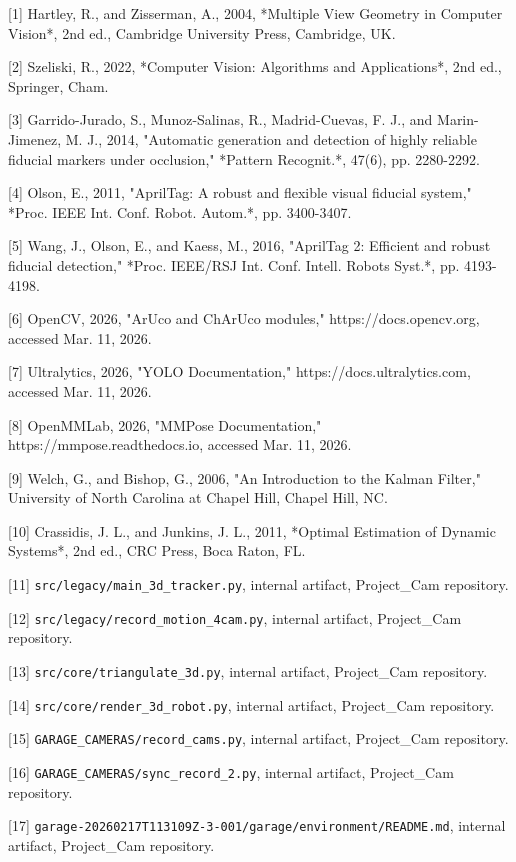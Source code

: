 [1] Hartley, R., and Zisserman, A., 2004, *Multiple View Geometry in Computer Vision*, 2nd ed., Cambridge University Press, Cambridge, UK.

[2] Szeliski, R., 2022, *Computer Vision: Algorithms and Applications*, 2nd ed., Springer, Cham.

[3] Garrido-Jurado, S., Munoz-Salinas, R., Madrid-Cuevas, F. J., and Marin-Jimenez, M. J., 2014, "Automatic generation and detection of highly reliable fiducial markers under occlusion," *Pattern Recognit.*, 47(6), pp. 2280-2292.

[4] Olson, E., 2011, "AprilTag: A robust and flexible visual fiducial system," *Proc. IEEE Int. Conf. Robot. Autom.*, pp. 3400-3407.

[5] Wang, J., Olson, E., and Kaess, M., 2016, "AprilTag 2: Efficient and robust fiducial detection," *Proc. IEEE/RSJ Int. Conf. Intell. Robots Syst.*, pp. 4193-4198.

[6] OpenCV, 2026, "ArUco and ChArUco modules," https://docs.opencv.org, accessed Mar. 11, 2026.

[7] Ultralytics, 2026, "YOLO Documentation," https://docs.ultralytics.com, accessed Mar. 11, 2026.

[8] OpenMMLab, 2026, "MMPose Documentation," https://mmpose.readthedocs.io, accessed Mar. 11, 2026.

[9] Welch, G., and Bishop, G., 2006, "An Introduction to the Kalman Filter," University of North Carolina at Chapel Hill, Chapel Hill, NC.

[10] Crassidis, J. L., and Junkins, J. L., 2011, *Optimal Estimation of Dynamic Systems*, 2nd ed., CRC Press, Boca Raton, FL.

[11] \texttt{src/legacy/main\_3d\_tracker.py}, internal artifact, Project\_Cam repository.

[12] \texttt{src/legacy/record\_motion\_4cam.py}, internal artifact, Project\_Cam repository.

[13] \texttt{src/core/triangulate\_3d.py}, internal artifact, Project\_Cam repository.

[14] \texttt{src/core/render\_3d\_robot.py}, internal artifact, Project\_Cam repository.

[15] \texttt{GARAGE\_CAMERAS/record\_cams.py}, internal artifact, Project\_Cam repository.

[16] \texttt{GARAGE\_CAMERAS/sync\_record\_2.py}, internal artifact, Project\_Cam repository.

[17] \texttt{garage-20260217T113109Z-3-001/garage/environment/README.md}, internal artifact, Project\_Cam repository.

